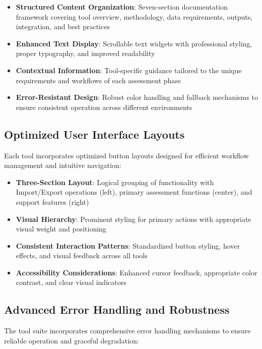 \documentclass[binding=0.6cm]{sapthesis}
\begin{document}
\begin{itemize}
    \item \textbf{Structured Content Organization}: Seven-section documentation framework covering tool overview, methodology, data requirements, outputs, integration, and best practices
    \item \textbf{Enhanced Text Display}: Scrollable text widgets with professional styling, proper typography, and improved readability
    \item \textbf{Contextual Information}: Tool-specific guidance tailored to the unique requirements and workflows of each assessment phase
    \item \textbf{Error-Resistant Design}: Robust color handling and fallback mechanisms to ensure consistent operation across different environments
\end{itemize}

\subsection{Optimized User Interface Layouts}

Each tool incorporates optimized button layouts designed for efficient workflow management and intuitive navigation:

\begin{itemize}
    \item \textbf{Three-Section Layout}: Logical grouping of functionality with Import/Export operations (left), primary assessment functions (center), and support features (right)
    \item \textbf{Visual Hierarchy}: Prominent styling for primary actions with appropriate visual weight and positioning
    \item \textbf{Consistent Interaction Patterns}: Standardized button styling, hover effects, and visual feedback across all tools
    \item \textbf{Accessibility Considerations}: Enhanced cursor feedback, appropriate color contrast, and clear visual indicators
\end{itemize}

\subsection{Advanced Error Handling and Robustness}

The tool suite incorporates comprehensive error handling mechanisms to ensure reliable operation and graceful degradation:
\end{document}
